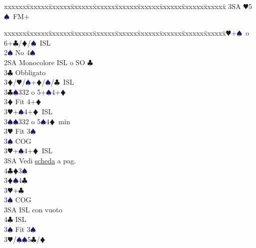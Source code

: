 \documentclass[a4paper,italian]{article}
\newcommand{\BC}{\textcolor{OliveGreen}{$\clubsuit$}}
\newcommand{\BD}{\textcolor{RedOrange}{$\vardiamondsuit$}}
\newcommand{\BH}{\textcolor{Red2}{$\varheartsuit${}}}
\newcommand{\BS}{\textcolor{MidnightBlue}{$\spadesuit${}}}
\newenvironment{bidtable}
{\begin{tabbing}

    xxxxxx\=xxxxxx\=xxxxxx\=xxxxxx\=xxxxxx\=xxxxxx\=xxxxxx\=xxxxxx\=xxxxxx\=xxxxxx\=\kill}
{\end{tabbing} }%
\begin{document}
\begin{multicols}{2}
\begin{bidtable}
                                            3SA \BH 5\BS\ FM+
                                        \end{bidtable}
                                        \bigbreak
                                        \begin{bidtable}
                                            2\BH {}+\BS\ o 6+\BC /\BD /\BS\ ISL\+\\
                                            2\BS \> No 4\BS \+\\
                                            2SA \> Monocolore ISL o SO \BC \+\\
                                            3\BC \> Obbligato\+\\
                                            3\BD/\BH/\BS {}+\BD /\BS /\BC\ ISL\-\-\\
                                            3\BC {}\BS 332 o 5+\BS 4+\BD \+\\
                                            3\BD \> Fit 4+\BD \+\\
                                            3\BH {}+\BS 4+\BD\ ISL\\
                                            3\BS {}\BS 332 o 5\BS 4\BD\ min\-\\
                                            3\BH \> Fit 3\BS \+\\
                                            3\BS \> COG\\
                                            3\BH {}+\BS 4+\BD\ ISL\-\\
                                            3SA\> Vedi \hyperref[Riapertura3SA]{scheda} a pag. \pageref{Riapertura3SA}\\
                                            4\BC {}\BD 3\BS \-\\
                                            3\BD {}\BS 4\BC \+\\
                                            3\BH {}+\BC \+\\
                                            3\BS \> COG\\
                                            3SA \> ISL con vuoto\\
                                            4\BC \> ISL\-\\
                                            3\BS \> Fit 3\BS \-\\
                                            3\BH/\BS {}\BS 5\BC /\BD \+\\

\end{bidtable}
\end{multicols}
\end{document}
